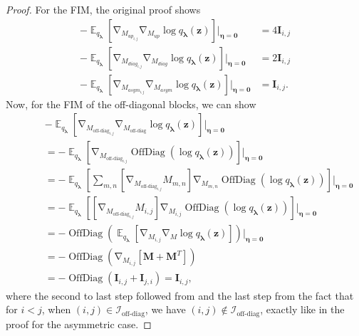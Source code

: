 \documentclass[a4paper, 11pt, oneside]{scrartcl}
\theoremstyle{break}
\DeclareMathOperator{\OffDiag}{OffDiag}
\DeclareMathOperator{\Expect}{\mathbb{E}}
\DeclareMathOperator{\grad}{\nabla}
\newcommand{\matr}[1]{\boldsymbol{#1}}
\newcommand{\set}[1]{\mathcal{#1}}
\numberwithin{equation}{section}
\begin{document}
\begin{proof}
					For the FIM, the original proof shows 
					\begin{align*}
						-\Expect_{q_{\matr{\lambda}}} [\grad_{M_{up_{i, j}}} \grad_{M_{up}} \log q_{\matr{\lambda}} (\matr{z})] |_{\matr{\eta} = \matr{0}} &= 4 \matr{I}_{i, j} \\
						-\Expect_{q_{\matr{\lambda}}} [\grad_{M_{diag_{i, j}}} \grad_{M_{diag}} \log q_{\matr{\lambda}} (\matr{z})] |_{\matr{\eta} = \matr{0}} &= 2 \matr{I}_{i, j} \\
						-\Expect_{q_{\matr{\lambda}}} [\grad_{M_{asym_{i, j}}} \grad_{M_{asym}} \log q_{\matr{\lambda}} (\matr{z})] |_{\matr{\eta} = \matr{0}} &= \matr{I}_{i, j}.
					\end{align*}
					Now, for the FIM of the off-diagonal blocks, we can show
					\begin{align*}
						&-\Expect_{q_{\matr{\lambda}}} \left[\grad_{M_{\text{off-diag}_{i, j}}} \grad_{M_{\text{off-diag}}} \log q_{\matr{\lambda}} (\matr{z}) \right] |_{\matr{\eta} = \matr{0}} \\
						\qquad&= -\Expect_{q_{\matr{\lambda}}} \left[\grad_{M_{\text{off-diag}_{i, j}}} \OffDiag ( \log q_{\matr{\lambda}} (\matr{z}) ) \right] |_{\matr{\eta} = \matr{0}} \\
						&= -\Expect_{q_{\matr{\lambda}}} \left[ \sum_{m, n} [\grad_{M_{\text{off-diag}_{i, j}}} M_{m, n}] \grad_{M_{m, n}} \OffDiag ( \log q_{\matr{\lambda}} (\matr{z}) ) \right] |_{\matr{\eta} = \matr{0}} \\
						&= -\Expect_{q_{\matr{\lambda}}} \left[ [\grad_{M_{\text{off-diag}_{i, j}}} M_{i, j}] \grad_{M_{i, j}} \OffDiag ( \log q_{\matr{\lambda}} (\matr{z}) ) \right] |_{\matr{\eta} = \matr{0}} \\
						&= -\OffDiag (\Expect_{q_{\matr{\lambda}}} \left[\grad_{M_{i, j}} \grad_M \log q_{\matr{\lambda}} (\matr{z}) \right] ) |_{\matr{\eta} = \matr{0}} \\
						&= -\OffDiag (\grad_{M_{i, j}} [\matr{M} + \matr{M}^T]) \\
						&= -\OffDiag (\matr{I}_{i, j} + \matr{I}_{j, i}) = \matr{I}_{i, j},
					\end{align*}
					where the second to last step followed from \parencite[Lemma 11]{LNK+21} and the last step from the fact that for $i < j$, when $(i, j) \in \set{I}_{\text{off-diag}}$, we have $(i, j) \notin \set{I}_{\text{off-diag}}$, exactly like in the proof for the asymmetric case. 


\end{proof}
\end{document}
